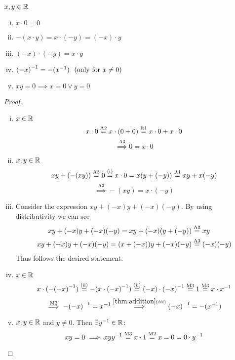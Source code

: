 \documentclass[../../script.tex]{subfiles}
\begin{document}
\begin{thm}
$x, y \in \mathbb{R}$

\begin{enumerate}[(i)]
	\item $x \cdot 0 = 0$
	\item $-(x \cdot y) = x \cdot (-y) = (-x) \cdot y$
	\item $(-x) \cdot (-y) = x \cdot y$
	\item ${(-x)}^{-1} = -({x}^{-1}) ~~(\text{only for } x \ne 0)$
	\item $xy = 0 \implies x = 0 \vee y = 0$
\end{enumerate}
\end{thm}
\begin{proof}\leavevmode
\begin{enumerate}[(i)]
	\item $x \in \mathbb{R}$
	\begin{equation}
		x \cdot 0 \stackrel{\text{A2}}{=} x \cdot (0 + 0)  \stackrel{\text{R1}}{=} x \cdot 0 + x \cdot 0
	\end{equation}
	\begin{equation}
		\stackrel{\text{A3}}{\implies} 0 = x \cdot 0
	\end{equation}
	
	\item $x,y \in \mathbb{R}$
	\begin{equation}
		xy + (-(xy)) \stackrel{\text{A3}}{=} 0 \stackrel{\text{(i)}}{=} x \cdot 0 = x(y + (-y)) \stackrel{\text{R1}}{=} xy + x(-y)
	\end{equation}
	\begin{equation}
		\stackrel{\text{A3}}{\implies} -(xy) = x\cdot(-y)
	\end{equation}
	
	\item Consider the expression $xy + (-x)y + (-x)(-y)$. By using distributivity we can see 
	\begin{align}
		xy + (-x)y + (-x)(-y) = xy + (-x)(y + (-y)) &\stackrel{\text{\text{A3}}}{=} xy \\
		xy + (-x)y + (-x)(-y) = (x + (-x))y + (-x)(-y) &\stackrel{\text{\text{A3}}}{=} (-x)(-y)
	\end{align}
	Thus follows the desired statement.

	\item $x \in \mathbb{R}$
	\begin{equation}
		x \cdot (-{(-x)}^{-1}) \stackrel{\text{(ii)}}{=} -(x \cdot {(-x)}^{-1}) \stackrel{\text{(ii)}}{=} (-x) \cdot {(-x)}^{-1} \stackrel{\text{M3}}{=} 1 \stackrel{\text{M3}}{=} x \cdot {x}^{-1}
	\end{equation}
	\begin{equation}
		\stackrel{\text{M3}}{\implies} -{(-x)}^{-1} = {x}^{-1} \stackrel{\ref{thm:addition} (iii)}{\implies} {(-x)}^{-1} = -({x}^{-1})		
	\end{equation}
	
	\item $x, y \in \mathbb{R}$ and $y \ne 0$. Then $\exists {y}^{-1} \in \mathbb{R}$:
	\begin{equation}
		xy = 0 \implies xy{y}^{-1} \stackrel{\text{M3}}{=} x \cdot 1 \stackrel{\text{M2}}{=} x = 0 = 0 \cdot {y}^{-1}
	\end{equation}
\end{enumerate}
\end{proof}
\end{document}
